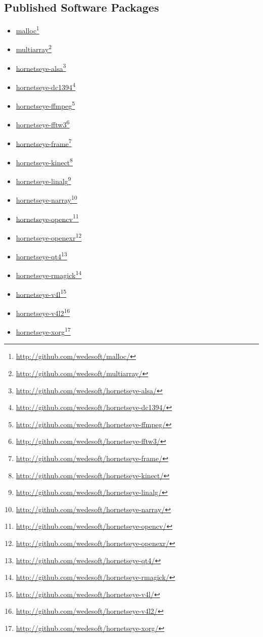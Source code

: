 \documentclass[12pt,a4paper,oneside,openright]{book}
\begin{document}
\begin{CJK}{UTF8}{}
\section*{Published Software Packages}\label{cha:software}
\begin{itemize}
\item \href{http://github.com/wedesoft/malloc/}{malloc}\footnote{\url{http://github.com/wedesoft/malloc/}}
\item \href{http://github.com/wedesoft/multiarray/}{multiarray}\footnote{\url{http://github.com/wedesoft/multiarray/}}
\item \href{http://github.com/wedesoft/hornetseye-alsa/}{hornetseye-alsa}\footnote{\url{http://github.com/wedesoft/hornetseye-alsa/}}
\item \href{http://github.com/wedesoft/hornetseye-dc1394/}{hornetseye-dc1394}\footnote{\url{http://github.com/wedesoft/hornetseye-dc1394/}}
\item \href{http://github.com/wedesoft/hornetseye-ffmpeg/}{hornetseye-ffmpeg}\footnote{\url{http://github.com/wedesoft/hornetseye-ffmpeg/}}
\item \href{http://github.com/wedesoft/hornetseye-fftw3/}{hornetseye-fftw3}\footnote{\url{http://github.com/wedesoft/hornetseye-fftw3/}}
\item \href{http://github.com/wedesoft/hornetseye-frame/}{hornetseye-frame}\footnote{\url{http://github.com/wedesoft/hornetseye-frame/}}
\item \href{http://github.com/wedesoft/hornetseye-kinect/}{hornetseye-kinect}\footnote{\url{http://github.com/wedesoft/hornetseye-kinect/}}
\item \href{http://github.com/wedesoft/hornetseye-linalg/}{hornetseye-linalg}\footnote{\url{http://github.com/wedesoft/hornetseye-linalg/}}
\item \href{http://github.com/wedesoft/hornetseye-narray/}{hornetseye-narray}\footnote{\url{http://github.com/wedesoft/hornetseye-narray/}}
\item \href{http://github.com/wedesoft/hornetseye-opencv/}{hornetseye-opencv}\footnote{\url{http://github.com/wedesoft/hornetseye-opencv/}}
\item \href{http://github.com/wedesoft/hornetseye-openexr/}{hornetseye-openexr}\footnote{\url{http://github.com/wedesoft/hornetseye-openexr/}}
\item \href{http://github.com/wedesoft/hornetseye-qt4/}{hornetseye-qt4}\footnote{\url{http://github.com/wedesoft/hornetseye-qt4/}}
\item \href{http://github.com/wedesoft/hornetseye-rmagick/}{hornetseye-rmagick}\footnote{\url{http://github.com/wedesoft/hornetseye-rmagick/}}
\item \href{http://github.com/wedesoft/hornetseye-v4l/}{hornetseye-v4l}\footnote{\url{http://github.com/wedesoft/hornetseye-v4l/}}
\item \href{http://github.com/wedesoft/hornetseye-v4l2/}{hornetseye-v4l2}\footnote{\url{http://github.com/wedesoft/hornetseye-v4l2/}}
\item \href{http://github.com/wedesoft/hornetseye-xorg/}{hornetseye-xorg}\footnote{\url{http://github.com/wedesoft/hornetseye-xorg/}}
\end{itemize}


\end{CJK}
\end{document}
